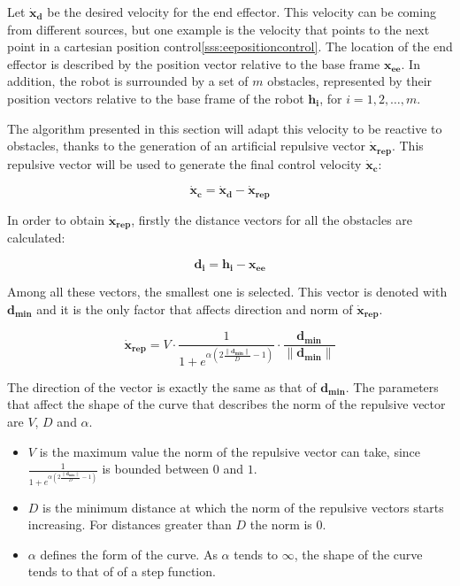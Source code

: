 Let $\mathbf{\dot{x}_d}$ be the desired velocity for the end effector. This velocity can be coming from different sources, but one example is the velocity that points to the next point in a cartesian position control\ref{sss:eepositioncontrol}. The location of the end effector is described by the position vector relative to the base frame $\mathbf{x_{ee}}$. In addition, the robot is surrounded by a set of $m$ obstacles, represented by their position vectors relative to the base frame of the robot $\mathbf{h_i}$, for $i=1,2, \ldots, m$.

The algorithm presented in this section will adapt this velocity to be reactive to obstacles, thanks to the generation of an artificial repulsive vector $\mathbf{\dot{x}_{rep}}$. This repulsive vector will be used to generate the final control velocity $\mathbf{\dot{x}_c}$:

$$
\mathbf{\dot{x}_c} = \mathbf{\dot{x}_d} - \mathbf{\dot{x}_{rep}}
$$

In order to obtain $\mathbf{\dot{x}_{rep}}$, firstly the distance vectors for all the obstacles are calculated:

$$
\mathbf{d_i} = \mathbf{h_i} - \mathbf{x_{ee}}
$$

Among all these vectors, the smallest one is selected. This vector is denoted with $\mathbf{d_{min}}$ and it is the only factor that affects direction and norm of $\mathbf{\dot{x}_{rep}}$.



\begin{equation}
    \label{eq:repvector}
    \mathbf{\dot{x}_{rep}} =
    V
    \cdot
    \frac{1}{1 + e^{\alpha (2 \frac{\|\mathbf{d_{min}}\|}{D} - 1)}}
    \cdot
    \frac{\mathbf{d_{min}}}{\|\mathbf{d_{min}}\|}
\end{equation}

The direction of the vector is exactly the same as that of $\mathbf{d_{min}}$. The parameters that affect the shape of the curve that describes the norm of the repulsive vector are $V$, $D$ and $\alpha$.

\begin{itemize}
    \item $V$ is the maximum value the norm of the repulsive vector can take, since $\frac{1}{1 + e^{\alpha (2 \frac{\|\mathbf{d_{min}}\|}{D} - 1)}}$ is bounded between $0$ and $1$.
    \item $D$ is the minimum distance at which the norm of the repulsive vectors starts increasing. For distances greater than $D$ the norm is 0.
    \item $\alpha$ defines the form of the curve. As $\alpha$ tends to $\infty$, the shape of the curve tends to that of of a step function.
\end{itemize}

